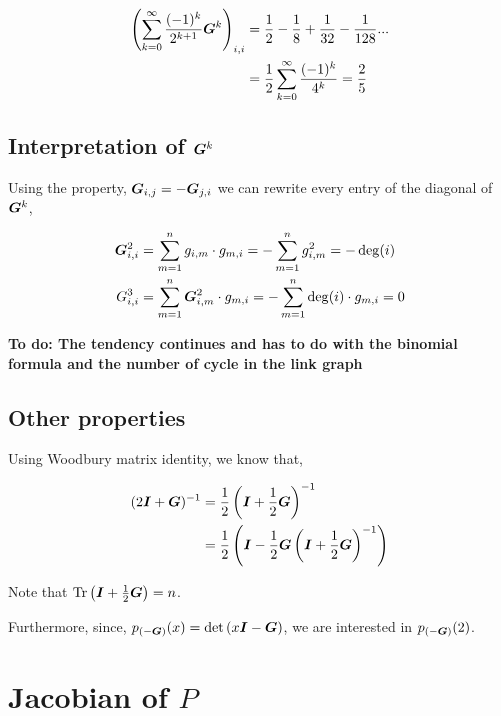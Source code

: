 \documentclass[american]{scrartcl}
\DeclareMathOperator{\Tr}{Tr}
\begin{document}
\begin{equation}
	\begin{split}
		\left(\sum^{\infty}_{k = 0} \frac{(-1)^k}{2^{k+1}} \bm{G}^k\right)_{i, i} &= \frac{1}{2} - \frac{1}{8} + \frac{1}{32} - \frac{1}{128}... \\
		&= \frac{1}{2} \sum^\infty_{k = 0} \frac{(-1)^k}{4^k} = \frac{2}{5}
	\end{split}
\end{equation}

\subsection{Interpretation of $\bm{G}^k$}

Using the property, $\bm{G}_{i, j} = - \bm{G}_{j, i}$ we can rewrite every entry of the diagonal of $\bm{G}^k$,

\begin{equation}
	\begin{split}
		\bm{G}^2_{i, i} &= \sum^n_{m = 1} g_{i, m} \cdot g_{m, i} = - \sum^n_{m=1} g^2_{i, m} = - \deg(i) \\
		G^3_{i, i} &= \sum^n_{m=1} \bm{G}^2_{i, m} \cdot g_{m, i} = - \sum^n_{m=1} \deg(i) \cdot g_{m, i} = 0
	\end{split}
\end{equation}

\textbf{To do: The tendency continues and has to do with the binomial formula and the number of cycle in the link graph}

\subsection{Other properties}

Using Woodbury matrix identity, we know that,

\begin{equation}
	\begin{split}
		(2\bm{I} + \bm{G})^{-1} &= \frac{1}{2}\left(\bm{I} + \frac{1}{2}\bm{G} \right)^{-1} \\
		&= \frac{1}{2} \left( \bm{I} - \frac{1}{2}\bm{G} \left(\bm{I} +\frac{1}{2}\bm{G}\right)^{-1} \right)
	\end{split}
\end{equation}


Note that $\Tr{\left(\I + \frac{1}{2}\G \right)} = n$.

Furthermore, since, $p_{(-\bm{G})}(x) = \det{(x \bm{I}- \bm{G})}$, we are interested in $p_{(-\bm{G})}(2)$.

\iffalse
	\section{Jacobian of $P$}
\end{document}
